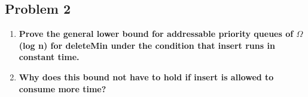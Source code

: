 \subsection{Problem 2}

\begin{enumerate}
    \item \textbf{Prove the general lower bound for addressable priority queues of $\Omega$(log n) for deleteMin under
the condition that insert runs in constant time.}

\item \textbf{Why does this bound not have to hold if insert is allowed to consume more time?}

\end{enumerate}

